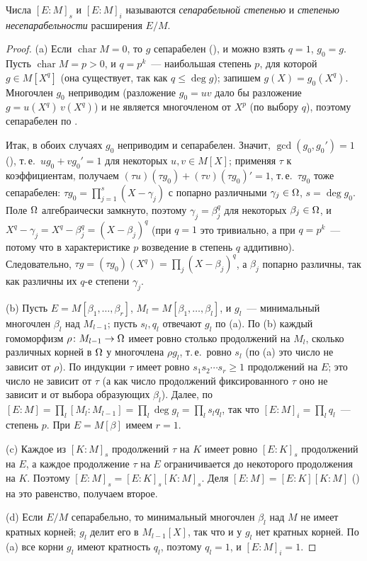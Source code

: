 Числа $[E:M]_s$ и $[E:M]_i$ называются \emph{сепарабельной степенью} и \emph{степенью несепарабельности} расширения
$E/M$.

\begin{proof}
(a) Если $\operatorname{char}M=0$, то $g$ сепарабелен (), и можно взять $q=1$, $g_0=g$. Пусть
$\operatorname{char}M=p>0$, и $q=p^k$~--- наибольшая степень $p$, для которой $g\in M[X^q]$ (она существует, так как
$q\le\deg g$); запишем $g(X)=g_0(X^q)$. Многочлен $g_0$ неприводим (разложение $g_0=uv$ дало бы разложение
$g=u(X^q)\,v(X^q)$) и не является многочленом от $X^p$ (по выбору $q$), поэтому сепарабелен по .

Итак, в обоих случаях $g_0$ неприводим и сепарабелен. Значит, $\gcd(g_0,g_0')=1$ (), т.\,е.\
$ug_0+vg_0'=1$ для некоторых $u,v\in M[X]$; применяя $\tau$ к коэффициентам, получаем
$(\tau u)(\tau g_0)+(\tau v)(\tau g_0)'=1$, т.\,е.\ $\tau g_0$ тоже сепарабелен: $\tau g_0=\prod_{j=1}^s(X-\gamma_j)$
с попарно различными $\gamma_j\in\Omega$, $s=\deg g_0$. Поле $\Omega$ алгебраически замкнуто, поэтому $\gamma_j=\beta_j^q$ для
некоторых $\beta_j\in\Omega$, и $X^q-\gamma_j=X^q-\beta_j^q=(X-\beta_j)^q$ (при $q=1$ это тривиально, а при $q=p^k$~---
потому что в характеристике $p$ возведение в степень $q$ аддитивно). Следовательно,
$\tau g=(\tau g_0)(X^q)=\prod_j(X-\beta_j)^q$, а $\beta_j$ попарно различны, так как различны их $q$-е степени
$\gamma_j$.

(b) Пусть $E=M[\beta_1,\dots,\beta_r]$, $M_l=M[\beta_1,\dots,\beta_l]$, и $g_l$~--- минимальный многочлен $\beta_l$ над
$M_{l-1}$; пусть $s_l,q_l$ отвечают $g_l$ по (a). По \rf{2.4}(b) каждый гомоморфизм $\rho\colon M_{l-1}\to\Omega$ имеет ровно
столько продолжений на $M_l$, сколько различных корней в $\Omega$ у многочлена $\rho g_l$, т.\,е.\ ровно $s_l$ (по (a) это
число не зависит от $\rho$). По индукции $\tau$ имеет ровно $s_1s_2\cdots s_r\ge1$ продолжений на $E$; это число не
зависит от $\tau$ (а как число продолжений фиксированного $\tau$ оно не зависит и от выбора образующих $\beta_l$). Далее,
по \rf{1.20} $[E:M]=\prod_l[M_l:M_{l-1}]=\prod_l\deg g_l=\prod_ls_lq_l$, так что $[E:M]_i=\prod_lq_l$~--- степень $p$. При
$E=M[\beta]$ имеем $r=1$.

(c) Каждое из $[K:M]_s$ продолжений $\tau$ на $K$ имеет ровно $[E:K]_s$ продолжений на $E$, а каждое продолжение $\tau$
на $E$ ограничивается до некоторого продолжения на $K$. Поэтому $[E:M]_s=[E:K]_s[K:M]_s$. Деля
$[E:M]=[E:K][K:M]$ (\rf{1.20}) на это равенство, получаем второе.

(d) Если $E/M$ сепарабельно, то минимальный многочлен $\beta_l$ над $M$ не имеет кратных корней; $g_l$ делит его в
$M_{l-1}[X]$, так что и у $g_l$ нет кратных корней. По (a) все корни $g_l$ имеют кратность $q_l$, поэтому $q_l=1$, и
$[E:M]_i=1$.
\end{proof}

